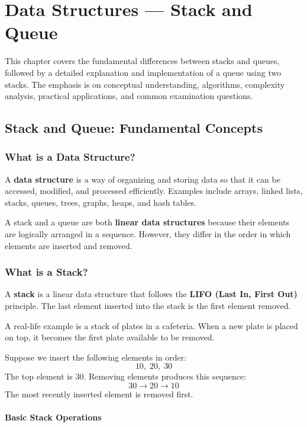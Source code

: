 \chapter{Data Structures --- Stack and Queue}
\label{ch:stack_and_queue}

This chapter covers the fundamental differences between stacks and queues, followed by a detailed explanation and implementation of a queue using two stacks. The emphasis is on conceptual understanding, algorithms, complexity analysis, practical applications, and common examination questions.

\section{Stack and Queue: Fundamental Concepts}

\subsection{What is a Data Structure?}

A \textbf{data structure} is a way of organizing and storing data so that it can be accessed, modified, and processed efficiently. Examples include arrays, linked lists, stacks, queues, trees, graphs, heaps, and hash tables.

A stack and a queue are both \textbf{linear data structures} because their elements are logically arranged in a sequence. However, they differ in the order in which elements are inserted and removed.

\subsection{What is a Stack?}

A \textbf{stack} is a linear data structure that follows the \textbf{LIFO (Last In, First Out)} principle. The last element inserted into the stack is the first element removed.

A real-life example is a stack of plates in a cafeteria. When a new plate is placed on top, it becomes the first plate available to be removed.

Suppose we insert the following elements in order:
\[
10, \; 20, \; 30
\]
The top element is $30$. Removing elements produces this sequence:
\[
30 \longrightarrow 20 \longrightarrow 10
\]
The most recently inserted element is removed first.

\subsubsection{Basic Stack Operations}


